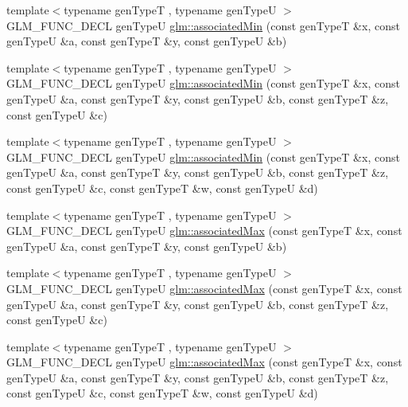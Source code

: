 \begin{DoxyCompactItemize}
\item 
{\footnotesize template$<$typename gen\-Type\-T , typename gen\-Type\-U $>$ }\\G\-L\-M\-\_\-\-F\-U\-N\-C\-\_\-\-D\-E\-C\-L gen\-Type\-U \hyperlink{group__gtx__associated__min__max_ga47bdb60409768f3d315bc5a1f739810a}{glm\-::associated\-Min} (const gen\-Type\-T \&x, const gen\-Type\-U \&a, const gen\-Type\-T \&y, const gen\-Type\-U \&b)
\item 
{\footnotesize template$<$typename gen\-Type\-T , typename gen\-Type\-U $>$ }\\G\-L\-M\-\_\-\-F\-U\-N\-C\-\_\-\-D\-E\-C\-L gen\-Type\-U \hyperlink{group__gtx__associated__min__max_ga3f696c0cce55211f333edb7336cc9cb8}{glm\-::associated\-Min} (const gen\-Type\-T \&x, const gen\-Type\-U \&a, const gen\-Type\-T \&y, const gen\-Type\-U \&b, const gen\-Type\-T \&z, const gen\-Type\-U \&c)
\item 
{\footnotesize template$<$typename gen\-Type\-T , typename gen\-Type\-U $>$ }\\G\-L\-M\-\_\-\-F\-U\-N\-C\-\_\-\-D\-E\-C\-L gen\-Type\-U \hyperlink{group__gtx__associated__min__max_ga45618e13844d00046a0fe3409ae7513e}{glm\-::associated\-Min} (const gen\-Type\-T \&x, const gen\-Type\-U \&a, const gen\-Type\-T \&y, const gen\-Type\-U \&b, const gen\-Type\-T \&z, const gen\-Type\-U \&c, const gen\-Type\-T \&w, const gen\-Type\-U \&d)
\item 
{\footnotesize template$<$typename gen\-Type\-T , typename gen\-Type\-U $>$ }\\G\-L\-M\-\_\-\-F\-U\-N\-C\-\_\-\-D\-E\-C\-L gen\-Type\-U \hyperlink{group__gtx__associated__min__max_gaee554495240b93d80492b3d2312ede1d}{glm\-::associated\-Max} (const gen\-Type\-T \&x, const gen\-Type\-U \&a, const gen\-Type\-T \&y, const gen\-Type\-U \&b)
\item 
{\footnotesize template$<$typename gen\-Type\-T , typename gen\-Type\-U $>$ }\\G\-L\-M\-\_\-\-F\-U\-N\-C\-\_\-\-D\-E\-C\-L gen\-Type\-U \hyperlink{group__gtx__associated__min__max_ga20218dcc769c76adf0c3e9aad21c64a4}{glm\-::associated\-Max} (const gen\-Type\-T \&x, const gen\-Type\-U \&a, const gen\-Type\-T \&y, const gen\-Type\-U \&b, const gen\-Type\-T \&z, const gen\-Type\-U \&c)
\item 
{\footnotesize template$<$typename gen\-Type\-T , typename gen\-Type\-U $>$ }\\G\-L\-M\-\_\-\-F\-U\-N\-C\-\_\-\-D\-E\-C\-L gen\-Type\-U \hyperlink{group__gtx__associated__min__max_ga23f2bce9c1d6f775cd1f7bf36525286e}{glm\-::associated\-Max} (const gen\-Type\-T \&x, const gen\-Type\-U \&a, const gen\-Type\-T \&y, const gen\-Type\-U \&b, const gen\-Type\-T \&z, const gen\-Type\-U \&c, const gen\-Type\-T \&w, const gen\-Type\-U \&d)
\end{DoxyCompactItemize}


